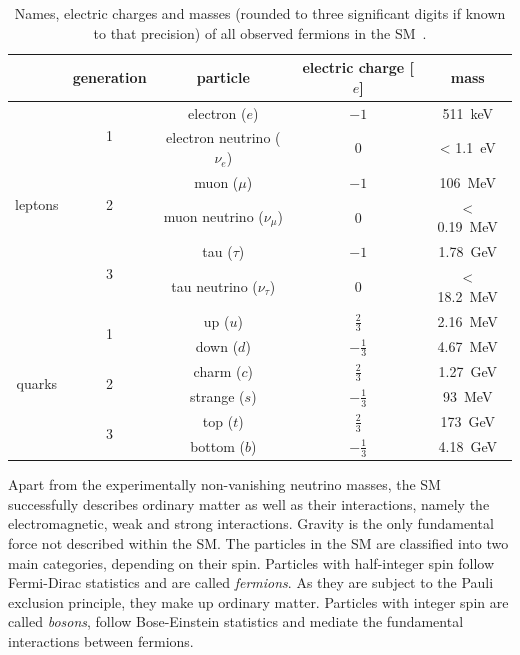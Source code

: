 \begin{table}
	\centering
	\setlength\heavyrulewidth{0.2ex}
	\small
	\caption{Names, electric charges and masses (rounded to three significant digits if known to that precision) of all observed fermions in the SM~\cite{pdg2020}.}
	\begin{tabular} {c c c c c}
		
		\toprule
				& generation & particle & electric charge [$e$] & mass \\ 
		\midrule 
				\multirow{6}{*}{leptons}& \multirow{2}{*}{1} & electron ($e$)& $-1$ & \SI{511}{\keV}\\
				& & electron neutrino ($\nu_e$) & 0 & < \SI{1.1}{\eV} \\
				& \multirow{2}{*}{2} & muon ($\mu$)& $-1$ & \SI{106}{\MeV}\\
				& & muon neutrino ($\nu_\mu$) & 0 & < \SI{0.19}{\MeV} \\
				& \multirow{2}{*}{3} & tau ($\tau$)& $-1$ & \SI{1.78}{\GeV}\\
				& & tau neutrino ($\nu_\tau$) & 0 & < \SI{18.2}{\MeV} \\
		\midrule 
				\multirow{6}{*}{quarks}& \multirow{2}{*}{1} & up ($u$)& $\frac{2}{3}$ & \SI{2.16}{\MeV}\\
				& & down ($d$) & $-\frac{1}{3}$ & \SI{4.67}{\MeV} \\
				& \multirow{2}{*}{2} & charm ($c$)& $\frac{2}{3}$ & \SI{1.27}{\GeV}\\
				& & strange ($s$) & $-\frac{1}{3}$ &\SI{93}{\MeV} \\
				& \multirow{2}{*}{3} & top ($t$)& $\frac{2}{3}$ & \SI{173}{\GeV}\\
				& & bottom ($b$) & $-\frac{1}{3}$ & \SI{4.18}{\GeV} \\
		\bottomrule
	\end{tabular}\vspace{3mm}
	\label{tab:particles_fermions}   
\end{table}

Apart from the experimentally non-vanishing neutrino masses, the SM successfully describes  ordinary matter as well as their interactions, namely the electromagnetic, weak and strong interactions. Gravity is the only fundamental force not described within the SM. The particles in the SM are classified into two main categories, depending on their spin. Particles with half-integer spin follow Fermi-Dirac statistics and are called \textit{fermions}. As they are subject to the Pauli exclusion principle, they make up ordinary matter. Particles with integer spin are called \textit{bosons}, follow Bose-Einstein statistics and mediate the fundamental interactions between fermions. 

